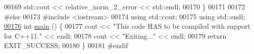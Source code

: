 \begin{DoxyCode}
00169   std::cout << relative\_norm\_2\_error << std::endl;
00170 \}
00171 
00172 \textcolor{preprocessor}{#else}
00173 \textcolor{preprocessor}{#include <iostream>}
00174 \textcolor{keyword}{using} std::cout;
00175 \textcolor{keyword}{using} std::endl;
\hypertarget{minimalistic__poisson__1d_8cc_source_l00176}{}\hyperlink{minimalistic__poisson__1d_8cc_ae66f6b31b5ad750f1fe042a706a4e3d4}{00176} \textcolor{keywordtype}{int} \hyperlink{minimalistic__poisson__1d_8cc_ae66f6b31b5ad750f1fe042a706a4e3d4}{main} () \{
00177   cout << \textcolor{stringliteral}{"This code HAS to be compiled with support for C++11."} << endl;
00178   cout << \textcolor{stringliteral}{"Exiting..."} << endl;
00179   \textcolor{keywordflow}{return} EXIT\_SUCCESS;
00180 \}
00181 \textcolor{preprocessor}{#endif}
\end{DoxyCode}
